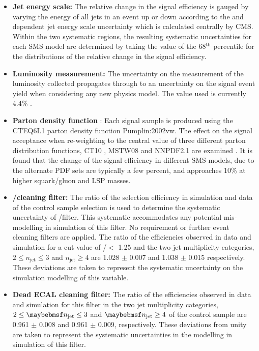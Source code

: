 \begin{itemize}
\item[]\textbf{Jet energy scale:} 
The relative change in the signal efficiency is gauged by varying the energy of all jets in an event up or down according to the \pt and \eta dependent jet energy scale uncertainty which is calculated centrally by \ac{CMS}. Within the two systematic regions, the resulting systematic uncertainties for each \ac{SMS} model are determined by taking the value of the 68$^{\text{th}}$ percentile for the distributions of the relative change in the signal efficiency.
\item[]\textbf{Luminosity measurement:} 
The uncertainty on the measurement of the luminosity collected propagates through to an uncertainty on the signal event yield when considering any new physics model. The value used is currently 4.4\% \cite{CMS-PAS-LUM-12-001}.
\item[]\textbf{Parton density function} :
Each signal sample is produced using the CTEQ6L1 parton density function \ac{Pumplin:2002vw}. The effect on the signal acceptance when re-weighting to the central value of three different parton distribution functions, CT10 \cite{Guzzi:2011sv}, MSTW08 \cite{Martin:2009iq} and NNPDF2.1 \cite{Cerutti:2011au} are examined \cite{Botje:2011sn}. It is found that the change of the signal efficiency in different \ac{SMS} models, due to the alternate \acf{PDF} sets are typically a few percent, and approaches 10\% at higher squark/gluon and \ac{LSP} masses.
\item[]\textbf{\mht/\met cleaning filter:} 
The ratio of the selection efficiency in simulation and data of the \mupjets control sample selection is used to determine the systematic uncertainty of \mht/\met filter. This systematic accommodates any potential mis-modelling in simulation of this filter. No \alphat requirement or further event cleaning filters are applied. The ratio of the efficiencies observed in data and simulation for a cut value of \mht/\met $<$ 1.25 and the two jet multiplicity categories, $2 \leq n_{\text{jet}} \leq 3$ and $n_{\text{jet}} \geq 4$ are 1.028 $\pm$ 0.007 and 1.038 $\pm$ 0.015 respectively. These deviations are taken to represent the systematic uncertainty on the simulation modelling of this variable.
\item[]\textbf{Dead ECAL cleaning filter:} 
The ratio of the efficiencies observed in data and simulation for this filter in the two jet multiplicity categories, $2 \leq \njet \leq 3$ and $\njet \geq 4$ of the  \mupjets control sample are 0.961 $\pm$ 0.008 and 0.961 $\pm$ 0.009, respectively. These deviations from unity are taken to represent the systematic uncertainties in the modelling in simulation of this filter.

\end{itemize}
